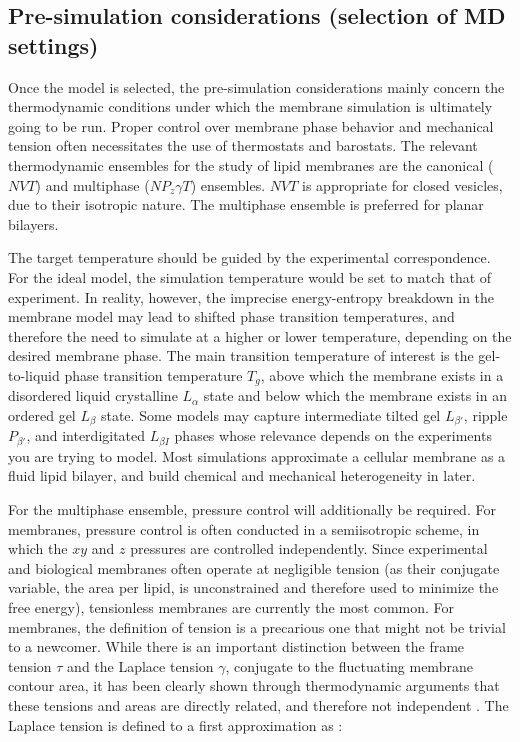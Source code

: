 \documentclass[9pt,bestpractices]{livecoms}
\begin{document}
\subsection{Pre-simulation considerations (selection of MD settings)}
\label{subsec:presim3}
Once the model is selected, the pre-simulation considerations mainly concern the thermodynamic conditions under which the membrane simulation is ultimately going to be run.
Proper control over membrane phase behavior and mechanical tension often necessitates the use of thermostats and barostats.
The relevant thermodynamic ensembles for the study of lipid membranes are the canonical ($NVT$) and multiphase ($NP_z \gamma T$) ensembles.
$NVT$ is appropriate for closed vesicles, due to their isotropic nature.
The multiphase ensemble is preferred for planar bilayers.

The target temperature should be guided by the experimental correspondence.
For the ideal model, the simulation temperature would be set to match that of experiment.
In reality, however, the imprecise energy-entropy breakdown in the membrane model may lead to shifted phase transition temperatures, and therefore the need to simulate at a higher or lower temperature, depending on the desired membrane phase.
The main transition temperature of interest is the gel-to-liquid phase transition temperature $T_g$, above which the membrane exists in a disordered liquid crystalline $L_\alpha$ state and below which the membrane exists in an ordered gel $L_\beta$ state.
Some models may capture intermediate tilted gel $L_{\beta '}$, ripple $P_{\beta '}$, and interdigitated $L_{\beta I}$ phases whose relevance depends on the experiments you are trying to model.
Most simulations approximate a cellular membrane as a fluid lipid bilayer, and build chemical and mechanical heterogeneity in later.

For the multiphase ensemble, pressure control will additionally be required.
For membranes, pressure control is often conducted in a semiisotropic scheme, in which the $xy$ and $z$ pressures are controlled independently.
Since experimental and biological membranes often operate at negligible tension (as their conjugate variable, the area per lipid, is unconstrained and therefore used to minimize the free energy), tensionless membranes are currently the most common.
For membranes, the definition of tension is a precarious one that might not be trivial to a newcomer.
While there is an important distinction between the frame tension $\tau$ and the Laplace tension $\gamma$, conjugate to the fluctuating membrane contour area, it has been clearly shown through thermodynamic arguments that these tensions and areas are directly related, and therefore not independent \cite{Diamant2011}.
The Laplace tension is defined to a first approximation as \cite{Kirkwood1949}:
\end{document}
